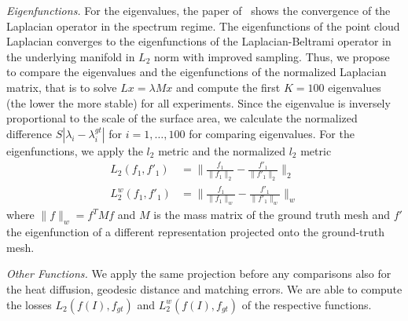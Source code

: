 \textit{Eigenfunctions. } For the eigenvalues, the paper of~\cite{belkin2006convergence} shows the convergence of the Laplacian operator in the spectrum regime. 
The eigenfunctions of the point cloud Laplacian converges to the eigenfunctions of the Laplacian-Beltrami operator in the underlying manifold in $L_2$ norm with improved sampling. 
Thus, we propose to compare the eigenvalues and the eigenfunctions of the normalized Laplacian matrix, that is to solve $Lx = \lambda Mx$ and compute the first $K=100$ eigenvalues (the lower the more stable) for all experiments. 
Since the eigenvalue is inversely proportional to the scale of the surface area, we calculate the normalized difference $S|\lambda_i - \lambda_i^{gt}|$ for $i = 1,\ldots, 100$ for comparing eigenvalues. 
For the eigenfunctions, we apply the $l_2$ metric and the normalized $l_2$ metric 
\[
\begin{array}{rl}
    L_2(f_1, f'_1) &= \|\frac{f_1}{\|f_1\|_2} - \frac{f'_1}{\|f'_1\|_2} \|_2 \\[0.3em]
    L_2^w(f_1, f'_1) &= \|\frac{f_1}{\|f_1\|_w} - \frac{f'_1}{\|f'_1\|_w} \|_w
\end{array}
\]
where $\|f\|_w = f^TMf$ and $M$ is the mass matrix of the ground truth mesh and $f'$ the eigenfunction of a different representation projected onto the ground-truth mesh.

\textit{Other Functions. }
We apply the same projection before any comparisons also for the heat diffusion, geodesic distance and matching errors.
We are able to compute the losses $L_2(f(I), f_{gt})$ and $L_2^w(f(I), f_{gt})$ of the respective functions.

